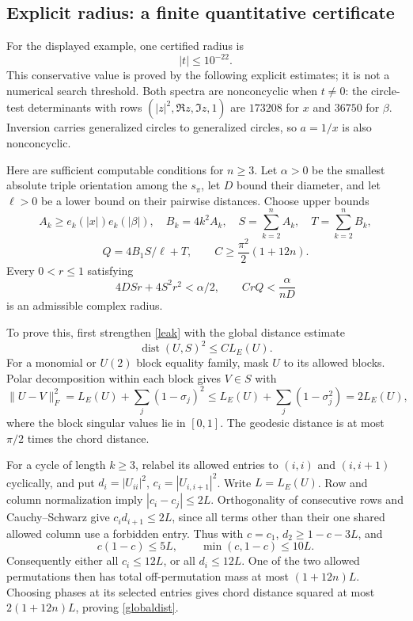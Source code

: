 \subsection{Explicit radius: a finite quantitative certificate}
For the displayed example, one certified radius is
\[
\boxed{|t|\le10^{-22}.}
\]
This conservative value is proved by the following explicit estimates; it is not a numerical search threshold. Both spectra are nonconcyclic when $t\ne0$: the circle-test determinants with rows $(|z|^2,\Re z,\Im z,1)$ are $173208$ for $x$ and $36750$ for $\beta$. Inversion carries generalized circles to generalized circles, so $a=1/x$ is also nonconcyclic.

Here are sufficient computable conditions for $n\ge3$. Let $\alpha>0$ be the smallest absolute triple orientation among the $s_\pi$, let $D$ bound their diameter, and let $\ell>0$ be a lower bound on their pairwise distances. Choose upper bounds
\[
A_k\ge e_k(|x|)e_k(|\beta|),\quad B_k=4k^2A_k,\quad
S=\sum_{k=2}^nA_k,\quad T=\sum_{k=2}^nB_k,
\]
\[
Q=4B_1S/\ell+T,\qquad C\ge\frac{\pi^2}{2}(1+12n).
\]
Every $0<r\le1$ satisfying
\begin{equation}\label{radius}
4DSr+4S^2r^2<\alpha/2,\qquad CrQ<\frac{\alpha}{nD}
\end{equation}
is an admissible complex radius.

To prove this, first strengthen \eqref{leak} with the global distance estimate
\begin{equation}\label{globaldist}
\operatorname{dist}(U,S)^2\le C L_E(U).
\end{equation}
For a monomial or $U(2)$ block equality family, mask $U$ to its allowed blocks. Polar decomposition within each block gives $V\in S$ with
\[
\|U-V\|_F^2=L_E(U)+\sum_j(1-\sigma_j)^2
\le L_E(U)+\sum_j(1-\sigma_j^2)=2L_E(U),
\]
where the block singular values lie in $[0,1]$. The geodesic distance is at most $\pi/2$ times the chord distance.

For a cycle of length $k\ge3$, relabel its allowed entries to $(i,i)$ and $(i,i+1)$ cyclically, and put $d_i=|U_{ii}|^2$, $c_i=|U_{i,i+1}|^2$. Write $L=L_E(U)$. Row and column normalization imply $|c_i-c_j|\le2L$. Orthogonality of consecutive rows and Cauchy--Schwarz give $c_i d_{i+1}\le2L$, since all terms other than their one shared allowed column use a forbidden entry. Thus with $c=c_1$, $d_2\ge1-c-3L$, and
\[
c(1-c)\le5L,\qquad \min(c,1-c)\le10L.
\]
Consequently either all $c_i\le12L$, or all $d_i\le12L$. One of the two allowed permutations then has total off-permutation mass at most $(1+12n)L$. Choosing phases at its selected entries gives chord distance squared at most $2(1+12n)L$, proving \eqref{globaldist}.

